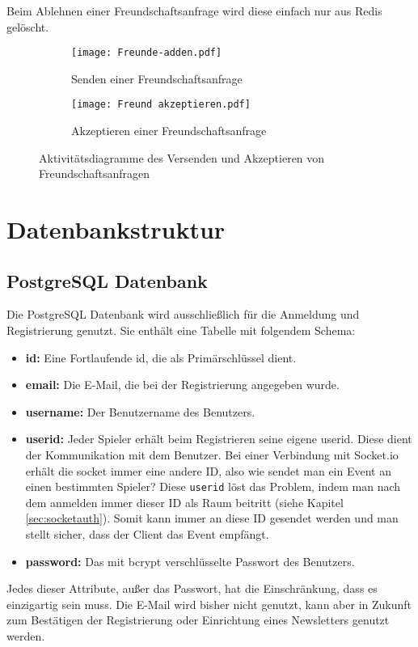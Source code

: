 Beim Ablehnen einer Freundschaftsanfrage wird diese einfach nur aus Redis gelöscht.

      \begin{figure}[!htbp]
      \centering
      \begin{subfigure}[b]{0.35\textwidth}
      \centering
  \texttt{[image: Freunde-adden.pdf]}
  \caption{Senden einer Freundschaftsanfrage}
  \label{fig:friend_request}
  \end{subfigure}
  \hspace{10mm}
  \begin{subfigure}[b]{0.3\textwidth}
  \centering
    \texttt{[image: Freund akzeptieren.pdf]}
  \caption{Akzeptieren einer Freundschaftsanfrage}
  \label{fig:friend_request}
  \end{subfigure}
  \caption{Aktivitätsdiagramme des Versenden und Akzeptieren von Freundschaftsanfragen}
  \label{fig:Freunde-backend}
 
\end{figure}

		\section{Datenbankstruktur}
\subsection{PostgreSQL Datenbank}
Die PostgreSQL Datenbank wird ausschließlich für die Anmeldung und Registrierung genutzt. Sie enthält eine Tabelle mit folgendem Schema:
\begin{itemize}
\item \textbf{id:} Eine Fortlaufende id, die als Primärschlüssel dient.
\item \textbf{email:} Die E-Mail, die bei der Registrierung angegeben wurde.
\item \textbf{username:} Der Benutzername des Benutzers.
\item \textbf{userid:} Jeder Spieler erhält beim Registrieren seine eigene userid. Diese dient der Kommunikation mit dem Benutzer. Bei einer Verbindung mit Socket.io erhält die socket immer eine andere ID, also wie sendet man ein Event an einen bestimmten Spieler? Diese \verb|userid| löst das Problem, indem man nach dem anmelden immer dieser ID als Raum beitritt (siehe Kapitel \ref{sec:socketauth}). Somit kann immer an diese ID gesendet werden und man stellt sicher, dass der Client das Event empfängt.
\item \textbf{password:} Das mit bcrypt verschlüsselte Passwort des Benutzers.
\end{itemize}
Jedes dieser Attribute, außer das Passwort, hat die Einschränkung, dass es einzigartig sein muss. Die E-Mail wird bisher nicht genutzt, kann aber in Zukunft zum Bestätigen der Registrierung oder Einrichtung eines Newsletters genutzt werden.

